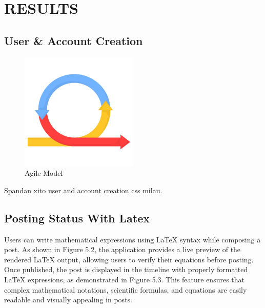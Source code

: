 \chapter{RESULTS}

\section{User \& Account Creation}

\begin{figure}[h!]
    \centering
    \includegraphics[width=0.5\textwidth]{Graphics/agile.png}
    \caption{Agile Model}
\end{figure}

Spandan xito user and account creation css milau.



\section{Posting Status With Latex}

Users can write mathematical expressions using LaTeX syntax while composing a post. As shown in Figure 5.2, the application provides a live preview of the rendered LaTeX output, allowing users to verify their equations before posting. Once published, the post is displayed in the timeline with properly formatted LaTeX expressions, as demonstrated in Figure 5.3. This feature ensures that complex mathematical notations, scientific formulas, and equations are easily readable and visually appealing in posts.

